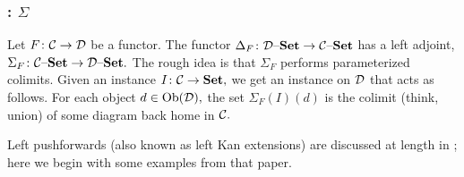 \documentclass[../main/CT4S-EN-RU]{subfiles}
\begin{document}

\subsubsection{: \texorpdfstring{$\Sigma$}{Σ}}\label{sec:left push}

\begin{blockENG}
Let $F\colon\mathcal{C}\rightarrow\mathcal{D}$ be a functor. The functor $\Delta_F\colon\mathcal{D}{\text \textendash}{\mathbf{Set}}\rightarrow\mathcal{C}{\text \textendash}{\mathbf{Set}}$ has a left adjoint, $\Sigma_F\colon\mathcal{C}{\text \textendash}{\mathbf{Set}}\rightarrow\mathcal{D}{\text \textendash}{\mathbf{Set}}.$ The rough idea is that $\Sigma_F$ performs parameterized colimits. Given an instance $I\colon\mathcal{C}\rightarrow{\mathbf{Set}},$ we get an instance on $\mathcal{D}$ that acts as follows. For each object $d\in\operatorname{Ob}(\mathcal{D}),$ the set $\Sigma_F(I)(d)$ is the colimit (think, union) of some diagram back home in $\mathcal{C}.$ 
\end{blockENG}

\begin{blockRUS}
\end{blockRUS}

\begin{blockENG}
Left pushforwards (also known as left Kan extensions) are discussed at length in \cite{Sp1}; here we begin with some examples from that paper.
\end{blockENG}

\begin{blockRUS}
\end{blockRUS}
\end{document}
